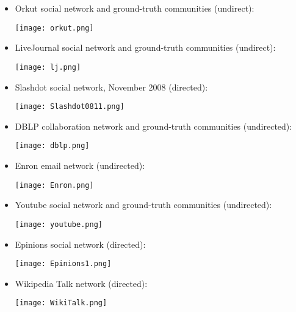 \documentclass[11pt]{article} %
\begin{document}
\begin{itemize}
	\item{Orkut social network and ground-truth communities (undirect): }  
	\begin{center}
		\texttt{[image: orkut.png]}
	\end{center}
	\item{ LiveJournal social network and ground-truth communities (undirect): }
	\begin{center}
		\texttt{[image: lj.png]}
	\end{center}
	\item{ Slashdot social network, November 2008 (directed): } 
	\begin{center}
		\texttt{[image: Slashdot0811.png]}
	\end{center}
	\item{DBLP collaboration network and ground-truth communities (undirected): }
	\begin{center}
		\texttt{[image: dblp.png]}
	\end{center}
	\item{ Enron email network (undirected): }
	\begin{center}
		\texttt{[image: Enron.png]}
	\end{center}
	\item{Youtube social network and ground-truth communities (undirected): } 
	\begin{center}
		\texttt{[image: youtube.png]}
	\end{center}
	\item{Epinions social network (directed): } 
	\begin{center}
		\texttt{[image: Epinions1.png]}
	\end{center}
	\item{Wikipedia Talk network (directed): } 
	\begin{center}
		\texttt{[image: WikiTalk.png]}
	\end{center}
	 


\end{itemize}
\end{document}
